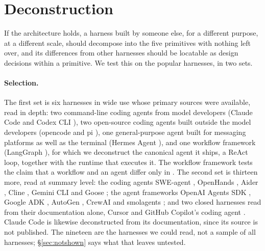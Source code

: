 \section{Deconstruction}
\label{sec:deconstruction}

If the architecture holds, a harness built by someone else, for a different purpose, at a different scale, should decompose into the five primitives with nothing left over, and its differences from other harnesses should be locatable as design decisions within a primitive. We test this on the popular harnesses, in two sets.

\paragraph{Selection.} The first set is six harnesses in wide use whose primary sources were available, read in depth: two command-line coding agents from model developers (Claude Code \citep{claudecode} and Codex CLI \citep{codexcli}), two open-source coding agents built outside the model developers (opencode \citep{opencode} and pi \citep{pi}), one general-purpose agent built for messaging platforms as well as the terminal (Hermes Agent \citep{hermes}), and one workflow framework (LangGraph \citep{langgraph}), for which we deconstruct the canonical agent it ships, a ReAct loop, together with the runtime that executes it. The workflow framework tests the claim that a workflow and an agent differ only in . The second set is thirteen more, read at summary level: the coding agents SWE-agent \citep{sweagentsrc}, OpenHands \citep{openhands}, Aider \citep{aider}, Cline \citep{cline}, Gemini CLI \citep{geminicli} and Goose \citep{goose}; the agent frameworks OpenAI Agents SDK \citep{openaiagents}, Google ADK \citep{googleadk}, AutoGen \citep{autogen}, CrewAI \citep{crewai} and smolagents \citep{smolagents}; and two closed harnesses read from their documentation alone, Cursor \citep{cursor} and GitHub Copilot's coding agent \citep{copilot}. Claude Code is likewise deconstructed from its documentation, since its source is not published. The nineteen are the harnesses we could read, not a sample of all harnesses; \S\ref{sec:notshown} says what that leaves untested.

